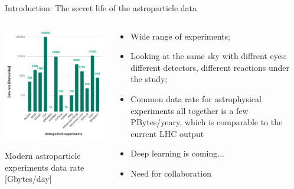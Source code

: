 \begin{frame}
\titlepage
\end{frame}

\begin{frame}{Introduction: The secret life of the astroparticle data}
\small
\begin{columns}
  \begin{column}[t]{0.45\textwidth}
    \begin{center}
      \includegraphics[width=0.79\linewidth]{pics/appec_base4.png}
    \end{center}
    \vspace{-2\parsep}
    \small Modern astroparticle experiments data rate [Gbytes/day]\footnotemark[1] %
  \end{column}
  \hfill
  \begin{column}[t]{0.53\textwidth}
    \begin{itemize}
    \item Wide range of experiments;
    \item Looking at the same sky with diffrent eyes: different detectors, different reactions under the study;
    \item Common data rate for astrophysical experiments all together is a few PBytes/yeary, which is comparable to the current LHC output\footnotemark[1] %
    \item Deep learning is coming...
    \item Need for collaboration
    \end{itemize}


\end{column}
\end{columns}
\end{frame}
